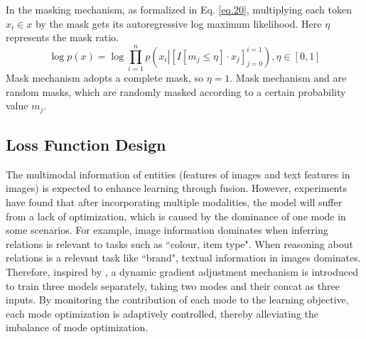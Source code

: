 \documentclass[10pt,journal,compsoc]{IEEEtran}
\begin{document}
In the masking mechanism, as formalized in Eq. \ref{eq.20}, multiplying each token $x_i \in x$ by the mask gets its autoregressive log maximum likelihood. Here $\eta$ represents the mask ratio.
\begin{equation}\label{eq.20}
\log p\left( x \right) = \log \prod\limits_{i = 1}^n {p\left( {{x_i}\left| {\left[ {I\left[ {{m_j}  \leq \eta } \right] \cdot {x_j}} \right]} \right._{j = 0}^{i = 1}} \right)} ,\eta  \in \left[ {0,1} \right]
\end{equation}
Mask mechanism  \uppercase\expandafter{} adopts a complete mask, so $\eta=1$. Mask mechanism  \uppercase\expandafter{} and \uppercase\expandafter{} are random masks, which are randomly masked according to a certain probability value $m_j$.\par
\subsection{Loss Function Design}\label{p5}
The multimodal information of entities (features of images and text features in images) is expected to enhance learning through fusion. However, experiments have found that after incorporating multiple modalities, the model will suffer from a lack of optimization, which is caused by the dominance of one mode in some scenarios. For example, image information dominates when inferring relations is relevant to tasks such as ``colour, item type". When reasoning about relations is a relevant task like ``brand", textual information in images dominates. Therefore, inspired by \cite{ref40}, a dynamic gradient adjustment mechanism is introduced to train three models separately, taking two modes and their concat as three inputs. By monitoring the contribution of each mode to the learning objective, each mode optimization is adaptively controlled, thereby alleviating the imbalance of mode optimization.
\end{document}
